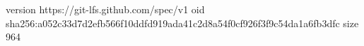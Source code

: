 version https://git-lfs.github.com/spec/v1
oid sha256:a052c33d7d2efb566f10ddfd919ada41c2d8a54f0cf926f3f9c54da1a6fb3dfc
size 964
